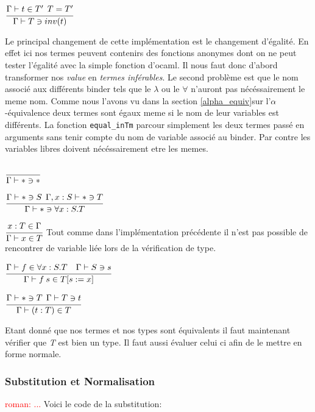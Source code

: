 \documentclass {article}
\newcommand{\codefrom}[3]
           {}
\theoremstyle{definition}
\theoremstyle{remark}
\newcommand{\todo}[1]{\textcolor{red}{#1}}
\newcommand{\fun}[1]{\lstinline!#1!}
\begin{document}
\codefrom{dependent}{lambda}{check_inv}
$\cfrac{\Gamma \vdash t \in T' \:\: T=T'}
    {\Gamma\vdash T \ni inv(t)}$

Le principal changement de cette implémentation est le changement d'égalité. 
En effet ici nos termes peuvent contenirs des fonctions anonymes dont on ne peut 
tester l'égalité avec la simple fonction d'ocaml. Il nous faut donc d'abord transformer 
nos \emph{value} en \emph{termes inférables}. Le second problème est que le nom associé 
aux différents binder tels que le $\lambda$ ou le $\forall$ n'auront pas nécéssairement le 
meme nom. Comme nous l'avons vu dans la section \ref{alpha_equiv}sur l'$\alpha$-équivalence 
deux termes sont égaux meme si le nom de leur variables est différents. 
La fonction \fun{equal_inTm} parcour simplement les deux termes passé en arguments sans tenir compte
du nom de variable associé au binder. Par contre les variables libres doivent nécéssairement etre les memes.

\codefrom{dependent}{lambda}{check_star}
$\cfrac{}
    {\Gamma \vdash * \ni *}$



\codefrom{dependent}{lambda}{check_pi}
$\cfrac{\Gamma \vdash * \ni S\:\:\Gamma,x:S \vdash *\ni T}
    {\Gamma\vdash * \ni \forall x:S.T}$





\codefrom{dependent}{lambda}{synth_var}
$\cfrac{x:T \in \Gamma}
    {\Gamma \vdash x \in T }$
Tout comme dans l'implémentation précédente il n'est pas possible de rencontrer de variable 
liée lors de la vérification de type.

\codefrom{dependent}{lambda}{synth_app}

$\cfrac{\Gamma \vdash f \in \forall x:S.T \quad \Gamma\vdash S \ni s }
    {\Gamma\vdash f\:s\in T[s := x]}$



\codefrom{dependent}{lambda}{synth_ann}

$\cfrac{\Gamma\vdash * \ni T \:\:\Gamma\vdash T \ni t}
    {\Gamma\vdash (t:T) \in T}$

Etant donné que nos termes et nos types sont équivalents il faut maintenant vérifier que 
\emph{T} est bien un type. Il faut aussi évaluer celui ci afin de le mettre en forme normale.



\subsubsection{Substitution et Normalisation}
\todo{roman: ...}
Voici le code de la substitution:
\codefrom{dependent}{lambda}{substitution_inTm}
\codefrom{dependent}{lambda}{substitution_exTm}
\end{document}
